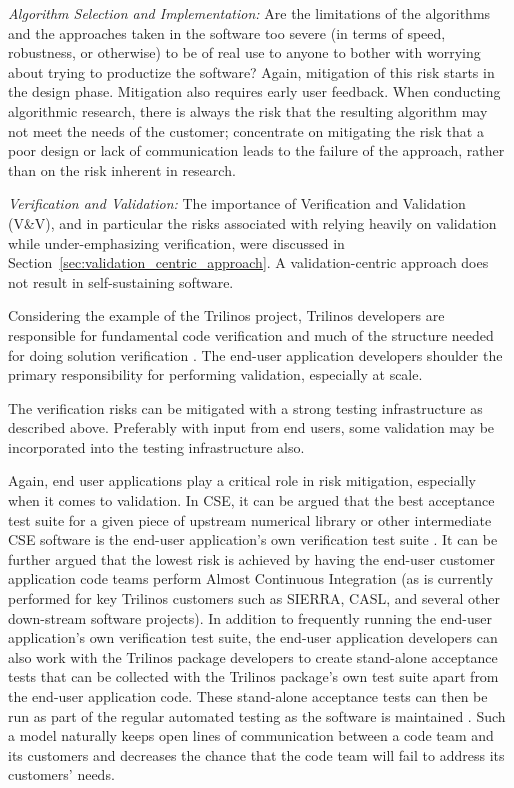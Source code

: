 \documentclass[11pt]{SANDreport}
\begin{document}
{}\textit{Algorithm Selection and Implementation:} Are the limitations of the algorithms and the approaches taken in the software too severe (in terms of speed, robustness, or otherwise) to be of real use to anyone to bother with worrying about trying to productize the software?  Again, mitigation of this risk starts in the design phase. Mitigation also requires early user feedback.  When conducting algorithmic research, there is always the risk that the resulting algorithm may not meet the needs of the customer; concentrate on mitigating the risk that a poor design or lack of communication leads to the failure of the approach, rather than on the risk inherent in research.

{}\textit{Verification and Validation:} The importance of Verification and Validation (V\&V), and in particular the risks associated with relying heavily on validation while under-emphasizing verification, were discussed in Section~\ref{sec:validation_centric_approach}.  A validation-centric approach does not result in self-sustaining software.

Considering the example of the Trilinos project, Trilinos developers are responsible for fundamental code verification and much of the structure needed for doing solution verification {}\cite{SEVVIntersections05}.  The end-user application developers shoulder the primary responsibility for performing validation, especially at scale.

The verification risks can be mitigated with a strong testing infrastructure as described above.  Preferably with input from end users, some validation may be incorporated into the testing infrastructure also.

Again, end user applications play a critical role in risk mitigation, especially when it comes to validation.  In CSE, it can be argued that the best acceptance test suite for a given piece of upstream numerical library or other intermediate CSE software is the end-user application's own verification test suite {}\cite{SoftwareIntegrationforCSE09}.  It can be further argued that the lowest risk is achieved by having the end-user customer application code teams perform Almost Continuous Integration {}\cite{SoftwareIntegrationforCSE09} (as is currently performed for key Trilinos customers such as SIERRA, CASL, and several other down-stream software projects).  In addition to frequently running the end-user application's own verification test suite, the end-user application developers can also work with the Trilinos package developers to create stand-alone acceptance tests that can be collected with the Trilinos package's own test suite apart from the end-user application code.  These stand-alone acceptance tests can then be run as part of the regular automated testing as the software is maintained {}\cite{DomainDrivenDesign}.  Such a model naturally keeps open lines of communication between a code team and its customers and decreases the chance that the code team will fail to address its customers' needs.
\end{document}
